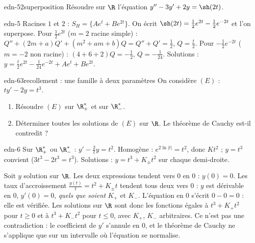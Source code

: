 \begin{exo}{edn-5}{2}{superposition}
Résoudre sur $\R$ l'équation $y''-3y'+2y=\sh(2t)$.
\end{exo}
\begin{corrige}{edn-5}
Racines $1$ et $2$ : $S_H=\{Ae^t+Be^{2t}\}$. On écrit $\sh(2t)=\frac12e^{2t}-\frac12e^{-2t}$ et l'on superpose.
Pour $\frac12e^{2t}$ ($m=2$ racine simple) : $Q''+(2m+a)Q'+(m^2+am+b)Q=Q''+Q'=\frac12$, $Q=\frac t2$.
Pour $-\frac12e^{-2t}$ ($m=-2$ non racine) : $(4+6+2)Q=-\frac12$, $Q=-\frac1{24}$.
Solutions : $y=\frac t2e^{2t}-\frac1{24}e^{-2t}+Ae^t+Be^{2t}$.
\end{corrige}

\begin{exo}{edn-6}{3}{recollement : une famille à deux paramètres}
On considère $(E)$ : $ty'-2y=t^3$.
\begin{enumerate}
\item Résoudre $(E)$ sur $\R_+^*$ et sur $\R_-^*$.
\item Déterminer toutes les solutions de $(E)$ sur $\R$. Le théorème de Cauchy est-il contredit ?
\end{enumerate}
\end{exo}
\begin{corrige}{edn-6}
 Sur $\R_+^*$ ou $\R_-^*$ : $y'-\frac2ty=t^2$. Homogène : $e^{2\ln|t|}=t^2$, donc $Kt^2$ ; $y=t^3$ convient
($3t^3-2t^3=t^3$). Solutions : $y=t^3+K_\pm t^2$ sur chaque demi-droite.

 Soit $y$ solution sur $\R$. Les deux expressions tendent vers $0$ en $0$ : $y(0)=0$. Les taux d'accroissement
$\frac{y(t)}t=t^2+K_\pm t$ tendent tous deux vers $0$ : $y$ est dérivable en $0$, $y'(0)=0$, \emph{quels que soient} $K_+$ et $K_-$.
L'équation en $0$ s'écrit $0-0=0$ : elle est vérifiée. Les solutions sur $\R$ sont donc les fonctions égales à $t^3+K_+t^2$ pour
$t\geq0$ et à $t^3+K_-t^2$ pour $t\leq0$, avec $K_+$, $K_-$ arbitraires.
Ce n'est pas une contradiction : le coefficient de $y'$ s'annule en $0$, et le théorème de Cauchy ne s'applique que sur un
intervalle où l'équation se normalise.
\end{corrige}

